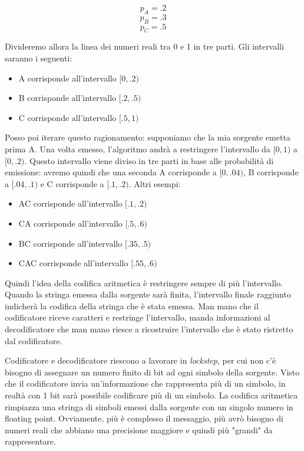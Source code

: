 \[p_A = .2\]
\[p_B = .3\]
\[p_C = .5\]

Divideremo allora la linea dei numeri reali tra 0 e 1 in tre parti. Gli intervalli saranno i seguenti:
\begin{itemize}
    \item A corrisponde all'intervallo \([0,.2)\)
    \item B corrisponde all'intervallo \([.2,.5)\)
    \item C corrisponde all'intervallo \([.5,1)\)
\end{itemize}

\begin{figure}[htbp!]
  \centering
  
\end{figure}

Posso poi iterare questo ragionamento: supponiamo che la mia sorgente emetta prima A. Una volta emesso, l'algoritmo andrà a restringere l'intervallo da \([0, 1)\) a  \([0,.2)\). Questo intervallo viene diviso in tre parti in base alle probabilità di emissione: avremo quindi che una seconda A corrisponde a  \([0,.04)\), B corrisponde a  \([.04,.1)\) e C corrisponde a  \([.1,.2)\). Altri esempi:
\begin{itemize}
    \item AC corrisponde all'intervallo \([.1,.2)\)
    \item CA corrisponde all'intervallo \([.5,.6)\)
    \item BC corrisponde all'intervallo \([.35,.5)\)
    \item CAC corrisponde all'intervallo \([.55,.6)\)
\end{itemize}

\begin{figure}[htbp!]
  \centering
  
\end{figure}

Quindi l'idea della codifica aritmetica è restringere sempre di più l'intervallo. Quando la stringa emessa dalla sorgente sarà finita, l'intervallo finale raggiunto indicherà la codifica della stringa che è stata emessa. Man mano che il codificatore riceve caratteri e restringe l'intervallo, manda informazioni al decodificatore che man mano riesce a ricostruire l'intervallo che è stato ristretto dal codificatore.

\vspace{5mm}

Codificatore e decodificatore riescono a lavorare in \textit{lockstep}, per cui non c'è bisogno di assegnare un numero finito di bit ad ogni simbolo della sorgente. Visto che il codificatore invia un'informazione che rappresenta più di un simbolo, in realtà con 1 bit sarà possibile codificare più di un simbolo. La codifica aritmetica rimpiazza una stringa di simboli emessi dalla sorgente con un singolo numero in floating point. Ovviamente, più è complesso il messaggio, più avrò bisogno di numeri reali che abbiano una precisione maggiore e quindi più "grandi" da rappresentare. 

